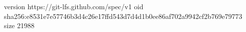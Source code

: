 version https://git-lfs.github.com/spec/v1
oid sha256:e8531e7e57746b3d4c26e17ffd543d7d4d1b0ee86af702a9942cf2b769e79773
size 21988
